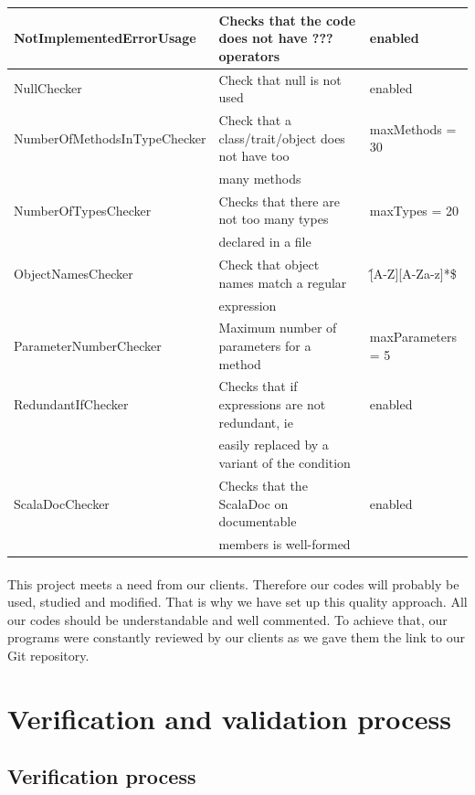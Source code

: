 \documentclass{report}
\begin{document}
\begin{center}
\begin{longtable}{|l|l|l|}
\small{NotImplementedErrorUsage} & \small{Checks that the code does not have ??? operators} & enabled \\
\hline
NullChecker & \small{Check that null is not used} & enabled \\
\hline
\small{NumberOfMethodsInTypeChecker} & \small{Check that a class/trait/object does not have too} & maxMethods = 30 \\
& \small{many methods} & \\
\hline
NumberOfTypesChecker & \small{Checks that there are not too many types} & maxTypes = 20 \\
& \small{declared in a file} & \\
\hline
ObjectNamesChecker & \small{Check that object names match a regular}  & \^[A-Z][A-Za-z]*\$ \\
& \small{expression} & \\
\hline
ParameterNumberChecker & \small{Maximum number of parameters for a method} & maxParameters = 5 \\
\hline
RedundantIfChecker & \small{Checks that if expressions are not redundant, ie} & enabled \\
& \small{easily replaced by a variant of the condition} &  \\
\hline
ScalaDocChecker & \small{Checks that the ScalaDoc on documentable}  & enabled \\
& \small{members is well-formed} & \\
\hline
\end{longtable} 
\end{center}
\paragraph{}
\hspace{4mm}\textnormal{This project meets a need from our clients. 
Therefore our codes will probably be used, studied and modified. 
That is why we have set up this quality approach. 
All our codes should be understandable and well commented. 
To achieve that, our programs were constantly reviewed by our clients
as we gave them the link to our Git repository. 
}

\section{Verification and validation process}

\subsection{Verification process}
\end{document}
